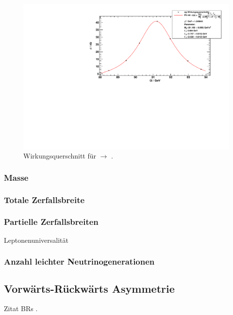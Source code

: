 \begin{figure}[H]
\begin{center}
  \includegraphics[width=\textwidth]{../img/crosssections_qq.pdf}
  \caption{Wirkungsquerschnitt für \ee $\to$ \qq.}
  \label{img:crosssection:qq}
\end{center}
\end{figure}

\subsubsection{Masse}
\subsubsection{Totale Zerfallsbreite}
\subsubsection{Partielle Zerfallsbreiten}
Leptonenuniversalität
\subsubsection{Anzahl leichter Neutrinogenerationen}
\subsection{Vorwärts-Rückwärts Asymmetrie}

Zitat BRs \cite{pdg}.